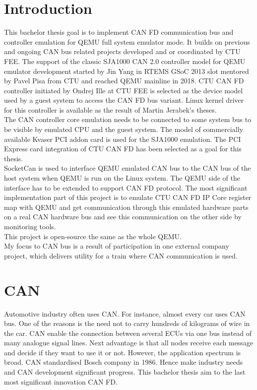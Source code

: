 \documentclass{ctuthesis}
\begin{document}
\chapter{Introduction}
 This bachelor thesis goal is to implement CAN FD communication bus and controller emulation for QEMU full system emulator mode. It builds on previous and ongoing CAN bus related projects developed and or coordinated by CTU FEE. The support of the classic SJA1000 CAN 2.0 controller model for QEMU emulator development started by Jin Yang in RTEMS GSoC 2013 slot mentored by Pavel Pisa from CTU and reached QEMU mainline in 2018. \cite{qemu-mainline} CTU CAN FD controller \cite{ctu-canfd-core} initiated by Ondrej Ille at CTU FEE is selected as the device model used by a guest system to access the CAN FD bus variant. Linux kernel driver for this controller is available as the result of Martin Jerabek's theses. \cite{ctu-canfd} \\
 The CAN controller core emulation needs to be connected to some system bus to be visible by emulated CPU and the guest system. The model of commercially available Kvaser PCI addon card is used for the SJA1000 emulation. The PCI Express card integration of CTU CAN FD \cite{ctu-project} has been selected as a goal for this thesis. \\
 SocketCan is used to interface QEMU emulated CAN bus to the CAN bus of the host system when QEMU is run on the Linux system. The QEMU side of the interface has to be extended to support CAN FD protocol.
 The most significant implementation part of this project is to emulate CTU CAN FD IP Core register map \cite{progdum} with QEMU and get communication through this emulated hardware parts on a real CAN hardware bus and see this communication on the other side by monitoring tools. \\
 This project is open-source the same as the whole QEMU. \\
 My focus to CAN bus is a result of participation in one external company
 project, which delivers utility for a train where CAN communication is used.

\chapter{CAN}
 Automotive industry often uses CAN.  For instance, almost every car uses CAN bus. One of the reasons is the need not to carry hundreds of kilograms of wire in the car. CAN enable the connection between several ECUs via one bus\cite{ECUs} instead of many analogue signal lines. Next advantage is that all nodes receive each message and decide if they want to use it or not. However, the application spectrum is broad. CAN standardised Bosch company in 1986. Hence make industry needs and CAN development significant progress. This bachelor thesis aim to the last most significant innovation CAN FD.
\end{document}
